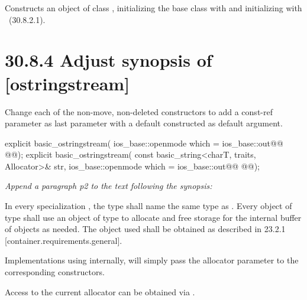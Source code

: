 \documentclass[ebook,11pt,article]{memoir}
\begin{document}
\begin{itemdescr}
\pnum
\effects
Constructs an object of class
,
initializing the base class with
and initializing  with
~({30.8.2.1}).
\end{itemdescr}



\section{30.8.4 Adjust synopsis of  [ostringstream]}
Change each of the non-move, non-deleted constructors to add a const-ref  parameter as last parameter with a default constructed  as default argument. 
\begin{codeblock}
explicit basic_ostringstream(
             ios_base::openmode which = ios_base::out@\added{,}@
             @@);
explicit basic_ostringstream(
             const basic_string<charT, traits, Allocator>& str,
             ios_base::openmode which = ios_base::out@\added{,}@
             @@);
\end{codeblock}

\textit{Append a paragraph p2 to the text following the synopsis:}

\begin{insrt}
\pnum
In every specialization , the type  shall name the same type as . Every object of type  shall use an object of type  to allocate and free storage for the internal buffer of  objects as needed. The  object used shall be obtained as described in 23.2.1 [container.requirements.general].
\begin{note}
Implementations using  internally, will simply pass the allocator parameter to the corresponding  constructors.
\end{note}
\begin{note}
Access to the current allocator can be obtained via .
\end{note}
\end{insrt}
\end{document}
